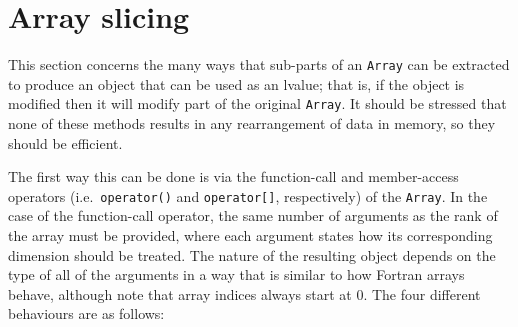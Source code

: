 \documentclass[a4,oneside]{book}
\def\codesize{\small}
\def\code#1{{\codesize\texttt{#1}}}
\begin{document}
\section{Array slicing}
\label{sec:slice}
This section concerns the many ways that sub-parts of an \code{Array}
can be extracted to produce an object that can be used as an lvalue;
that is, if the object is modified then it will modify part of the
original \code{Array}. It should be stressed that none of these
methods results in any rearrangement of data in memory, so they should
be efficient.

The first way this can be done is via the function-call and
member-access operators (i.e.\ \code{operator()} and
\code{operator[]}, respectively) of the \code{Array}. In the case of
the function-call operator, the same number of arguments as the rank
of the array must be provided, where each argument states how its
corresponding dimension should be treated.  The nature of the
resulting object depends on the type of all of the arguments in a way
that is similar to how Fortran arrays behave, although note that
array indices always start at 0. The four different behaviours are as
follows:
\end{document}
